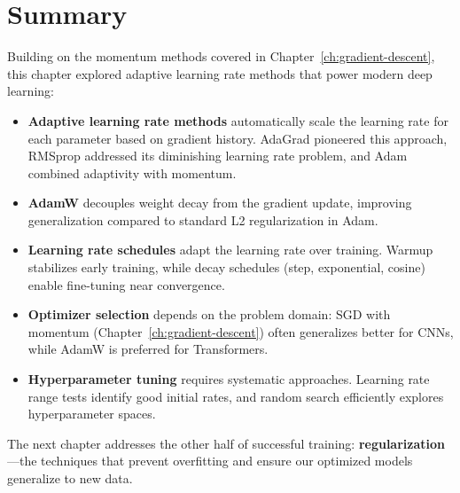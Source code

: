 \documentclass[../../main.tex]{subfiles}
\begin{document}
\section{Summary}
\label{sec:adv-opt-summary}

Building on the momentum methods covered in Chapter~\ref{ch:gradient-descent}, this chapter explored adaptive learning rate methods that power modern deep learning:

\begin{itemize}
    \item \textbf{Adaptive learning rate methods} automatically scale the learning rate for each parameter based on gradient history. AdaGrad pioneered this approach, RMSprop addressed its diminishing learning rate problem, and Adam combined adaptivity with momentum.

    \item \textbf{AdamW} decouples weight decay from the gradient update, improving generalization compared to standard L2 regularization in Adam.

    \item \textbf{Learning rate schedules} adapt the learning rate over training. Warmup stabilizes early training, while decay schedules (step, exponential, cosine) enable fine-tuning near convergence.

    \item \textbf{Optimizer selection} depends on the problem domain: SGD with momentum (Chapter~\ref{ch:gradient-descent}) often generalizes better for CNNs, while AdamW is preferred for Transformers.

    \item \textbf{Hyperparameter tuning} requires systematic approaches. Learning rate range tests identify good initial rates, and random search efficiently explores hyperparameter spaces.
\end{itemize}

The next chapter addresses the other half of successful training: \textbf{regularization}---the techniques that prevent overfitting and ensure our optimized models generalize to new data.
\end{document}
